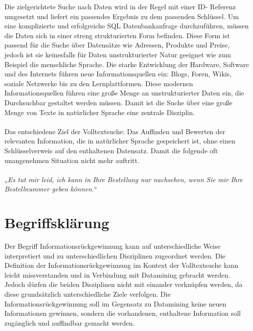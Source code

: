 Die zielgerichtete Suche nach Daten wird in der Regel mit einer ID-
Referenz umgesetzt und liefert ein passendes Ergebnis zu dem passenden
Schlüssel. Um eine komplizierte und erfolgreiche SQL Datenbankanfrage
durchzuführen, müssen die Daten sich in einer streng strukturierten
Form befinden. Diese Form ist passend für die Suche über Datensätze wie
Adressen, Produkte und Preise, jedoch ist sie keinesfalls für Daten
unstrukturierter Natur geeignet %
wie zum Beispiel die menschliche Sprache.
\newline
Die starke Entwicklung der Hardware, Software und des Internets führen
neue Informationsquellen ein: Blogs, Foren, Wikis, soziale Netzwerke
bis zu den Lernplattformen. Diese modernen Informationsquellen führen
eine große Menge an unstrukturierter Daten ein, die Durchsuchbar
gestaltet werden müssen. Damit ist die Suche über eine große Menge von
Texte in natürlicher Sprache eine zentrale Disziplin. 
\\\\
Das entschiedene Ziel der Volltextsuche: Das Auffinden und Bewerten der
relevanten Information, die in natürlicher Sprache gespeichert ist,
ohne einen Schlüsselverweis auf den enthaltenen Datensatz. 
\newline
Damit die folgende oft unangenehmen Situation nicht mehr auftritt.
\\\\
\textit{„Es tut mir leid, ich kann in Ihre Bestellung nur nachsehen, wenn Sie
mir Ihre Bestellnummer geben können.“}

\section[Begriffsklärung]{Begriffsklärung}
Der Begriff Informationsrückgewinnung kann auf unterschiedliche Weise
interpretiert und zu unterschiedlichen Disziplinen zugeordnet werden. 
\newline
Die Definition der Informationsrückgewinnung im Kontext der
Volltextsuche kann leicht missverstanden und in Verbindung mit
Datamining gebracht werden. Jedoch dürfen die beiden Disziplinen nicht
mit einander verknüpfen werden, da diese grundsätzlich unterschiedliche
Ziele verfolgen.
\newline
Die Informationsrückgewinnung soll im Gegensatz zu Datamining keine
neuen Informationen gewinnen, sondern die vorhandenen, enthaltene
Information soll zugänglich und auffindbar gemacht werden.

